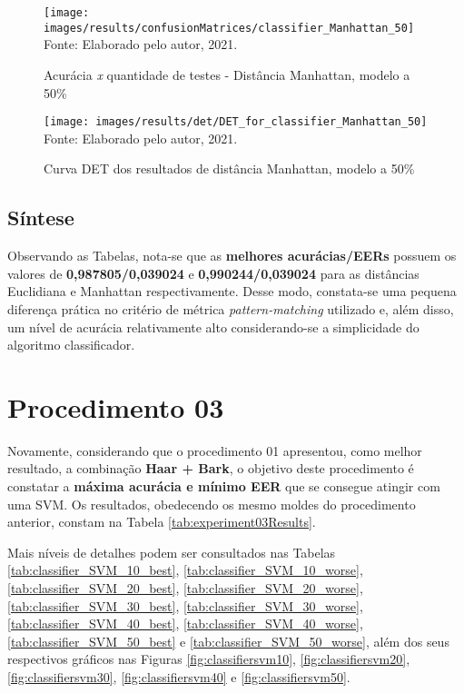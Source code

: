 			\begin{figure}[H]
				\centering
				\caption{Acurácia \textit{x} quantidade de testes - Distância Manhattan, modelo a 50\%}
				\texttt{[image: images/results/confusionMatrices/classifier\_Manhattan\_50]}
				\label{fig:classifiermanhattan50}
				\\Fonte: Elaborado pelo autor, 2021.
			\end{figure}
	
			\begin{figure}[H]
				\centering
				\caption{Curva DET dos resultados de distância Manhattan, modelo a 50\%}
				\texttt{[image: images/results/det/DET\_for\_classifier\_Manhattan\_50]}
				\label{fig:detforclassifiermanhattan50}
				\\Fonte: Elaborado pelo autor, 2021.
			\end{figure}

		\subsection{Síntese}
			\par Observando as Tabelas, nota-se que as \textbf{melhores acurácias/EERs} possuem os valores de \textbf{0,987805/0,039024} e \textbf{0,990244/0,039024} para as distâncias Euclidiana e Manhattan respectivamente. Desse modo, constata-se uma pequena diferença prática no critério de métrica \textit{pattern-matching} utilizado e, além disso, um nível de acurácia relativamente alto considerando-se a simplicidade do algoritmo classificador.

	\section{Procedimento 03}
		\label{chap:testsResults:sec:Experimento03}
		\par Novamente, considerando que o procedimento 01 apresentou, como melhor resultado, a combinação \textbf{Haar + Bark}, o objetivo deste procedimento é constatar a \textbf{máxima acurácia e mínimo EER} que se consegue atingir com uma SVM. Os resultados, obedecendo os mesmo moldes do procedimento anterior, constam na Tabela \ref{tab:experiment03Results}.\\
		
		\par Mais níveis de detalhes podem ser consultados nas Tabelas \ref{tab:classifier_SVM_10_best}, \ref{tab:classifier_SVM_10_worse}, \ref{tab:classifier_SVM_20_best}, \ref{tab:classifier_SVM_20_worse}, \ref{tab:classifier_SVM_30_best}, \ref{tab:classifier_SVM_30_worse}, \ref{tab:classifier_SVM_40_best}, \ref{tab:classifier_SVM_40_worse}, \ref{tab:classifier_SVM_50_best} e \ref{tab:classifier_SVM_50_worse}, além dos seus respectivos gráficos nas Figuras \ref{fig:classifiersvm10}, \ref{fig:classifiersvm20}, \ref{fig:classifiersvm30}, \ref{fig:classifiersvm40} e \ref{fig:classifiersvm50}.

